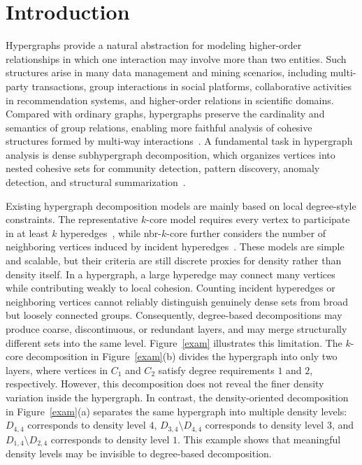 \documentclass[twocolumn]{svjour3}
\begin{document}
\section{Introduction}

Hypergraphs provide a natural abstraction for modeling higher-order relationships in which one interaction may involve more than two entities. Such structures arise in many data management and mining scenarios, including multi-party transactions, group interactions in social platforms, collaborative activities in recommendation systems, and higher-order relations in scientific domains. Compared with ordinary graphs, hypergraphs preserve the cardinality and semantics of group relations, enabling more faithful analysis of cohesive structures formed by multi-way interactions~\cite{DBLP:journals/corr/abs-2204-05646,DBLP:journals/corr/abs-2301-04235}. 
A fundamental task in hypergraph analysis is dense subhypergraph decomposition, which organizes vertices into nested cohesive sets for community detection, pattern discovery, anomaly detection, and structural summarization~\cite{DBLP:journals/pvldb/QinZLLYW25,9458645,DBLP:journals/pvldb/ArafatKRG23}.

Existing hypergraph decomposition models are mainly based on local degree-style constraints. The representative $k$-core model requires every vertex to participate in at least $k$ hyperedges~\cite{9458645}, while nbr-$k$-core further considers the number of neighboring vertices induced by incident hyperedges~\cite{DBLP:journals/pvldb/ArafatKRG23,DBLP:journals/pacmmod/ZhangYWLZL25}. These models are simple and scalable, but their criteria are still discrete proxies for density rather than density itself. In a hypergraph, a large hyperedge may connect many vertices while contributing weakly to local cohesion. Counting incident hyperedges or neighboring vertices cannot reliably distinguish genuinely dense sets from broad but loosely connected groups. Consequently, degree-based decompositions may produce coarse, discontinuous, or redundant layers, and may merge structurally different sets into the same level.
Figure~\ref{exam} illustrates this limitation. The $k$-core decomposition in Figure~\ref{exam}(b) divides the hypergraph into only two layers, where vertices in $C_1$ and $C_2$ satisfy degree requirements $1$ and $2$, respectively. However, this decomposition does not reveal the finer density variation inside the hypergraph. In contrast, the density-oriented decomposition in Figure~\ref{exam}(a) separates the same hypergraph into multiple density levels: $D_{4,4}$ corresponds to density level $4$, $D_{3,4}\setminus D_{4,4}$ corresponds to density level $3$, and $D_{1,4}\setminus D_{2,4}$ corresponds to density level $1$. This example shows that meaningful density levels may be invisible to degree-based decomposition.
\end{document}
